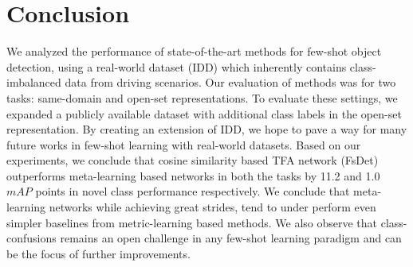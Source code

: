 \documentclass[letterpaper]{article} %
\begin{document}
\section{Conclusion}
We analyzed the performance of state-of-the-art methods for few-shot object detection, using a real-world dataset (IDD) which inherently contains class-imbalanced data from driving scenarios. Our evaluation of methods was for two tasks: same-domain and open-set representations. To evaluate these settings, we expanded a publicly available dataset with additional class labels in the open-set representation. By creating an extension of IDD, we hope to pave a way for many future works in few-shot learning with real-world datasets.
Based on our experiments, we conclude that cosine similarity based TFA network (FsDet) outperforms meta-learning based networks in both the tasks by 11.2 and 1.0 $mAP$ points in novel class performance respectively. We conclude that meta-learning networks while achieving great strides, tend to under perform even simpler baselines from metric-learning based methods. We also observe that class-confusions remains an open challenge in any few-shot learning paradigm and can be the focus of further improvements.




\end{document}
